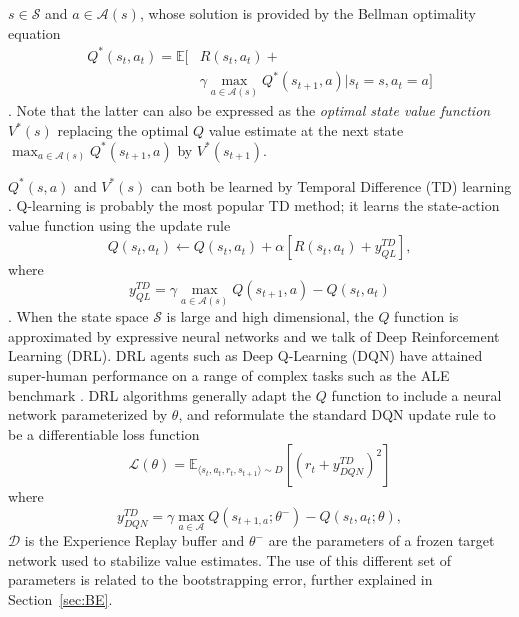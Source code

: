 $s\in\mathcal{S}$ and $a\in\mathcal{A}\left(s\right)$, whose solution
is provided by the Bellman optimality equation
\begin{equation}
\begin{aligned}
Q^*\left(s_t,a_t\right)=\mathbb{E}\bigg[&R\left(s_t,a_t\right)+\\ &\gamma
  \max_{a\in\mathcal{A}\left(s\right)}Q^*\left(s_{t+1},a\right)\bigg\vert
  s_t=s,a_t=a \bigg]
\end{aligned}
\end{equation}
\citep{bellman1957dynamic}. Note that the latter can
also be expressed as the \textit{optimal state value function}
$V^*\left(s\right)$ replacing the optimal $Q$ value estimate at
the next state
$\max_{a\in\mathcal{A}\left(s\right)}Q^*\left(s_{t+1},a\right)$ by
$V^*\left(s_{t+1}\right)$.

$Q^*\left(s,a\right)$ and $V^*\left(s\right)$ can both be learned by
Temporal Difference (TD) learning
\citep{sutton1988learning}. Q-learning is probably the most popular TD
method; it learns the state-action value function using the update
rule
\begin{equation}
Q\left(s_t,a_t\right)\leftarrow
Q\left(s_t,a_t\right)+\alpha\left[R\left(s_t,a_t\right)+y^{\scriptscriptstyle
TD}_{\scriptscriptstyle QL}\right],
\end{equation}
where
\[
y^{\scriptscriptstyle TD}_{\scriptscriptstyle
QL}=\gamma\max_{a\in\mathcal{A}\left(s\right)}Q\left(s_{t+1},a\right)-Q\left(s_t,a_t\right)
\]
\citep{watkins1992q}. When the state space $\mathcal{S}$ is large and
high dimensional, the $Q$ function is approximated by expressive
neural networks and we talk of Deep Reinforcement Learning
(DRL). DRL agents such as Deep Q-Learning (DQN)
\citep{mnih2013playing} have attained super-human performance on a
range of complex tasks such as the ALE benchmark
\citep{bellemare2013arcade}. DRL algorithms generally adapt the $Q$
function to include a neural network parameterized by $\theta$, and
reformulate the standard DQN update rule to be a differentiable loss
function
\begin{equation}
\mathcal{L}(\theta)=\mathbb{E}_{\langle s_t,a_t,r_t,s_{t+1}\rangle\sim
D}\left[{\left(r_t+y^{\scriptscriptstyle TD}_{\scriptscriptstyle
DQN}\right)}^2\right]
\end{equation}
where
\[
y^{\scriptscriptstyle TD}_{\scriptscriptstyle DQN}=\gamma
\max_{a\in\mathcal{A}}Q(s_{t+1,a};\theta^{-})-Q(s_t, a_t;\theta),
\]
$\mathcal{D}$ is the Experience Replay buffer
\citep{lin1992self} and $\theta^-$ are the parameters of a frozen
target network used to stabilize value estimates. The use of this
different set of parameters is related to the bootstrapping error,
further explained in Section~\ref{sec:BE}.

